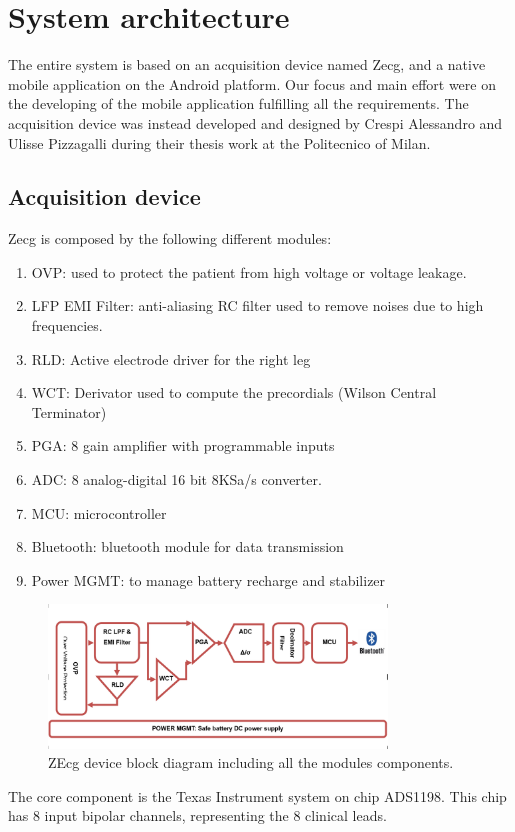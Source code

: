 \chapter{System architecture}
\label{Chapter8}
The entire system is based on an acquisition device named Zecg, and a native mobile application on the Android platform. Our focus and main effort were on the developing of the mobile application fulfilling all the requirements. The acquisition device was instead developed and designed by Crespi Alessandro and Ulisse Pizzagalli during their thesis work at the Politecnico of Milan.
\section{Acquisition device}
Zecg is composed by the following different modules:
\begin{enumerate}
	\item OVP: used to protect the patient from high voltage or voltage leakage.
	\item LFP EMI Filter: anti-aliasing RC filter used to remove noises due to high frequencies.
	\item RLD: Active electrode driver for the right leg
	\item WCT: Derivator used to compute the precordials (Wilson Central Terminator)
	\item PGA: 8 gain amplifier with programmable inputs
	\item ADC: 8 analog-digital 16 bit 8KSa/s converter.
	\item MCU: microcontroller
	\item Bluetooth: bluetooth module for data transmission
	\item Power MGMT: to manage battery recharge and stabilizer
\end{enumerate}
\begin{figure}[ht!]
	\centering
	\includegraphics[width=90mm]{figures/ch8/1.png}
	\caption{ZEcg device block diagram including all the modules components.}
	\label{fig8.1}
\end{figure}
The core component is the Texas Instrument system on chip ADS1198. This chip has 8 input bipolar channels, representing the 8 clinical leads.\\
